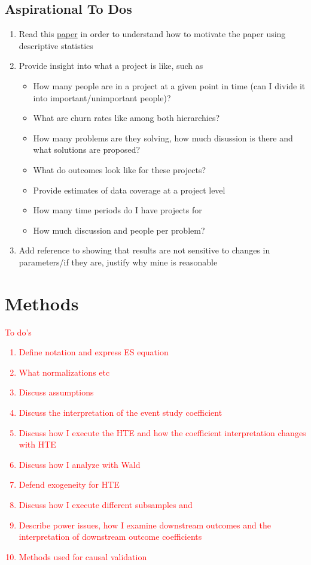 \documentclass[12pt,notitlepage]{article}
\begin{document}
\subsection{Aspirational To Dos}
\begin{enumerate}
    \item Read this  \href{https://pubs.aeaweb.org/doi/pdfplus/10.1257/jep.36.3.211}{paper} in order to understand how to motivate the paper using descriptive statistics
    \item Provide insight into what a project is like, such as
    \begin{itemize}
        \item How many people are in a project at a given point in time (can I divide it into important/unimportant people)?
        \item What are churn rates like among both hierarchies?
        \item How many problems are they solving, how much disussion is there and what solutions are proposed?
        \item What do outcomes look like for these projects?
        \item Provide estimates of data coverage at a project level     
        \item How many time periods do I have projects for
        \item How much discussion and people per problem?
    \end{itemize}
    \item Add reference to showing that results are not sensitive to changes in parameters/if they are, justify why mine is reasonable 
\end{enumerate}



\section{Methods} \label{sec:method}



\textcolor{red}{To do's
\begin{enumerate}
    \item Define notation and express ES equation
    \item What normalizations etc
    \item Discuss assumptions
    \item Discuss the interpretation of the event study coefficient
    \item Discuss how I execute the HTE and how the coefficient interpretation changes with HTE
    \item Discuss how I analyze with Wald
    \item Defend exogeneity for HTE
    \item Discuss how I execute different subsamples and 
    \item Describe power issues, how I examine downstream outcomes and the interpretation of downstream outcome coefficients
    \item Methods used for causal validation 
\end{enumerate}}
\end{document}
